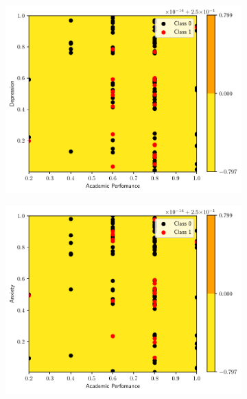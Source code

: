 \begin{figure}
    \begin{subfigure}[b]{0.32\textwidth}
        \centering
        \includegraphics[width=\textwidth]{figs/tree-contour-1-3.pdf}
        \caption{}
    \end{subfigure}
    \begin{subfigure}[b]{0.32\textwidth}
        \centering
        \includegraphics[width=\textwidth]{figs/tree-contour-1-4.pdf}
        \caption{}
    \end{subfigure}
    \begin{subfigure}[b]{0.32\textwidth}
        \centering

\end{subfigure}
\end{figure}
